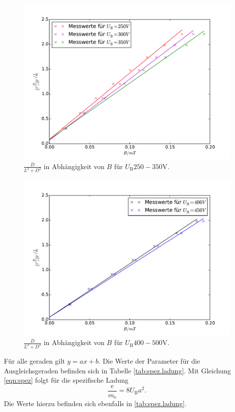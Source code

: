 \begin{figure}
  \centering
  \includegraphics[scale=0.8]{auswertung/502-a.pdf}
\caption{$\frac{D}{L^2+D^2}$ in Abhängigkeit von $B$ für $U_\mathrm{B} 250 - 350 \si{\volt}$.}
  \label{fig:spez.ladung1}
\end{figure}

\begin{figure}
  \centering
  \includegraphics[scale=0.8]{auswertung/502-a2.pdf}
\caption{$\frac{D}{L^2+D^2}$ in Abhängigkeit von $B$ für $U_\mathrm{B} 400 - 500 \si{\volt}$.}
  \label{fig:spez.ladung2}
\end{figure}

Für alle geraden gilt $y=ax+b$. Die Werte der Parameter für die Ausgleichsgeraden befinden sich in Tabelle \ref{tab:spez.ladung}.
Mit Gleichung \eqref{eqn:spez} folgt für die spezifische Ladung
\begin{equation}
  \frac{e}{m_\mathrm{e}}=8U_\mathrm{B}a^2.
\end{equation}
Die Werte hierzu befinden sich ebenfalls in \ref{tab:spez.ladung}.


